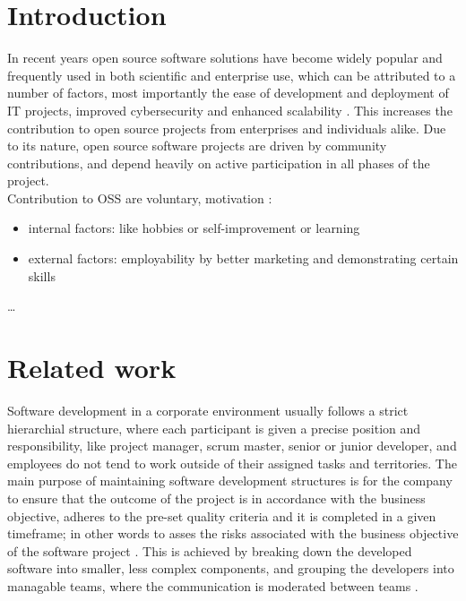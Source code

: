 \thepage
\section{Introduction}


In recent years open source software solutions have become widely popular and frequently used in both scientific and enterprise use, which can be attributed to a number of factors, most importantly the ease of development and deployment of IT projects, improved cybersecurity and enhanced scalability \cite{pwcLeadingBenefitsOpensource2016}. This increases the contribution to open source projects from enterprises and individuals alike. Due to its nature, open source software projects are driven by community contributions, and depend heavily on active participation in all phases of the project. \\

Contribution to OSS are voluntary, motivation \cite{elasriPeripheryCoreTemporal2017}:
\begin{itemize}
    \item internal factors: like hobbies or self-improvement \cite{alexanderharsWorkingFreeMotivations2002} or learning \cite{yunwenyeUnderstandingMotivationOpen2003}
    \item external factors: employability by better marketing and demonstrating certain skills \cite{alexanderharsWorkingFreeMotivations2002}
\end{itemize}
\dots

\section{Related work}
Software development in a corporate environment usually follows a strict hierarchial structure, where each participant is given a precise position and responsibility, like project manager, scrum master, senior or junior developer, and employees do not tend to work outside of their assigned tasks and territories. The main purpose of maintaining software development structures is for the company to ensure that the outcome of the project is in accordance with the business objective, adheres to the pre-set quality criteria and it is completed in a given timeframe; in other words to asses the risks associated with the business objective of the software project \cite{surekaUsingSocialNetwork2011}. This is achieved by breaking down the developed software into smaller, less complex components, and grouping the developers into managable teams, where the communication is moderated between teams \cite{birdLatentSocialStructure2008}. \\


